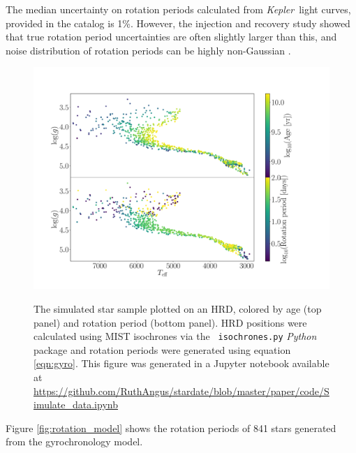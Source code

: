 \documentclass[useAMS, usenatbib, preprint, 12pt]{aastex}
\newcommand{\eg}{{\it e.g.}}
\newcommand{\kepler}{{\it Kepler}}
\begin{document}
The median uncertainty on rotation periods calculated from \kepler\ light
curves, provided in the \citet{mcquillan2014} catalog is 1\%.
However, the \citet{aigrain2015} injection and recovery study showed that true
rotation period uncertainties are often slightly larger than this, and noise
distribution of rotation periods can be highly non-Gaussian
\citep[\eg][]{aigrain2015, angus2018}.
\begin{figure}
  \caption{
      The simulated star sample plotted on an HRD, colored by age
    (top panel) and rotation period (bottom panel).
    HRD positions were calculated using MIST isochrones via the {\tt
    isochrones.py} {\it Python} package and rotation periods were generated
    using equation \ref{eqn:gyro}.
    This figure was generated in a Jupyter notebook available at
    \url{https://github.com/RuthAngus/stardate/blob/master/paper/code/Simulate_data.ipynb}
}
  \centering
    \includegraphics[width=1\textwidth]{simulated_CMD}
\label{fig:CMD_age}
\end{figure}
Figure \ref{fig:rotation_model} shows the rotation periods of 841
stars generated from the gyrochronology model.
\end{document}
